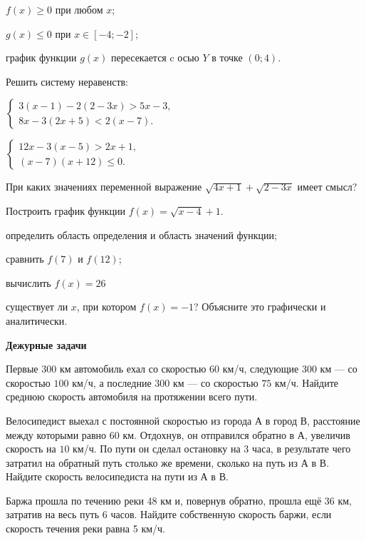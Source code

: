 \begin{class}[number=1]
\begin{listofex}
\begin{enumcols}[itemcolumns=1, resume]
			\item \( f(x)\ge0 \) при любом \( x \);
			\item \( g(x)\le0 \) при \( x\in[-4;-2] \);
			\item график функции \( g(x) \) пересекается c осью \( Y \) в точке \( (0;4) \).
		\end{enumcols}
		\item Решить систему неравенств:
		\begin{enumcols}[itemcolumns=2]
			\item
			\( \left\{
			\begin{array}{l}
				3(x-1)-2(2-3x)>5x-3,\\
				8x-3(2x+5)<2(x-7).
			\end{array}
			\right. \)
			\item
			\( \left\{
			\begin{array}{l}
				12x-3(x-5)>2x+1,\\
				(x-7)(x+12)\le0.
			\end{array}
			\right. \)
		\end{enumcols}
		
		\item При каких значениях переменной выражение \( \sqrt{4x+1}+\sqrt{2-3x} \) имеет смысл?
		\item Построить график функции \( f(x)=\sqrt{x-4}+1 \).
		\begin{enumcols}[itemcolumns=1]
			\item определить область определения и область значений функции;
			\item сравнить \( f(7) \) и \( f(12) \);
			\item вычислить \( f(x)=26 \)
			\item существует ли \( x \), при котором \( f(x)=-1 \)? Объясните это графически и аналитически.
		\end{enumcols}
	\end{listofex}
	\textbf{Дежурные задачи}
	\begin{listofex}
		\item Первые \( 300 \) км автомобиль ехал со скоростью \( 60 \) км/ч, следующие 300 км --- со скоростью \( 100 \) км/ч, а последние \( 300 \) км --- со скоростью \( 75 \) км/ч. Найдите среднюю скорость автомобиля на протяжении всего пути.
		\item Велосипедист выехал с постоянной скоростью из города \( А \) в город \( В \), расстояние между которыми равно \( 60 \) км. Отдохнув, он отправился обратно в \( А \), увеличив скорость на \( 10 \) км/ч. По пути он сделал остановку на \( 3 \) часа, в
		результате чего затратил на обратный путь столько же времени, сколько на путь из \( А \) в \( В \). Найдите скорость велосипедиста на пути из \( А \) в \( В \).
		\item Баржа прошла по течению реки 48 км и, повернув обратно, прошла ещё 36 км, затратив на весь путь 6 часов. Найдите собственную скорость баржи, если скорость течения реки равна 5 км/ч.
	\end{listofex}
\end{class}

